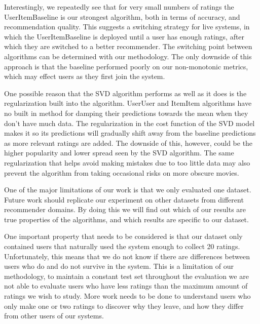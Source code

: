 \documentclass[letterpaper]{sig-alternate}
\begin{document}
  Interestingly, we repeatedly see that for very small numbers of ratings the UserItemBaseline is our strongest algorithm, both in terms of accuracy, and recommendation quality.
  This suggests a switching strategy for live systems, in which the UserItemBaseline is deployed until a user has enough ratings, after which they are switched to a better recommender.
  The switching point between algorithms can be determined with our methodology.
  The only downside of this approach is that the baseline performed poorly on our non-monotonic metrics, which may effect users as they first join the system.
  

  One possible reason that the SVD algorithm performs as well as it does is the regularization built into the algorithm.
  UserUser and ItemItem algorithms have no built in method for damping their predictions towards the mean when they don't have much data.
  The regularization in the cost function of the SVD model makes it so its predictions will gradually shift away from the baseline predictions as more relevant ratings are added.
  The downside of this, however, could be the higher popularity and lower spread seen by the SVD algorithm.
  The same regularization that helps avoid making mistakes due to too little data may also prevent the algorithm from taking occasional risks on more obscure movies.
  


  One of the major limitations of our work is that we only evaluated one dataset.
  Future work should replicate our experiment on other datasets from different recommender domains.
  By doing this we will find out which of our results are true properties of the algorithms, and which results are specific to our dataset.

  One important property that needs to be considered is that our dataset only contained users that naturally used the system enough to collect 20 ratings.
  Unfortunately, this means that we do not know if there are differences between users who do and do not survive in the system.
  This is a limitation of our methodology, to maintain a constant test set throughout the evaluation we are not able to evaluate users who have less ratings than the maximum amount of ratings we wish to study.
  More work needs to be done to understand users who only  make one or two ratings to discover why they leave, and how they differ from other users of our systems.
\end{document}
